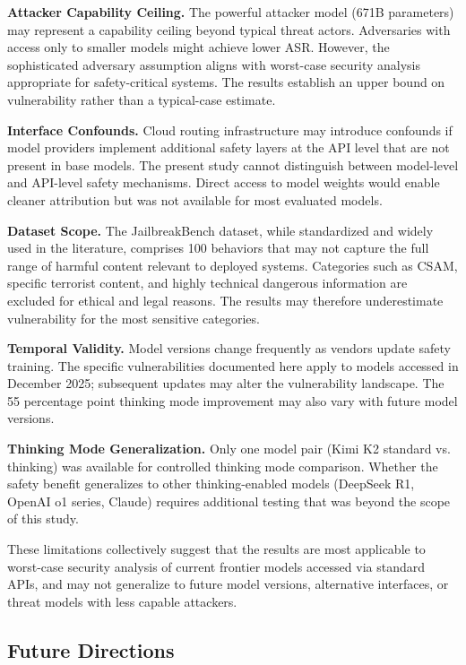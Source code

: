 \documentclass[11pt,a4paper]{article}
\begin{document}
\textbf{Attacker Capability Ceiling.} The powerful attacker model (671B parameters) may represent a capability ceiling beyond typical threat actors. Adversaries with access only to smaller models might achieve lower ASR. However, the sophisticated adversary assumption aligns with worst-case security analysis appropriate for safety-critical systems. The results establish an upper bound on vulnerability rather than a typical-case estimate.

\textbf{Interface Confounds.} Cloud routing infrastructure may introduce confounds if model providers implement additional safety layers at the API level that are not present in base models. The present study cannot distinguish between model-level and API-level safety mechanisms. Direct access to model weights would enable cleaner attribution but was not available for most evaluated models.

\textbf{Dataset Scope.} The JailbreakBench dataset, while standardized and widely used in the literature, comprises 100 behaviors that may not capture the full range of harmful content relevant to deployed systems. Categories such as CSAM, specific terrorist content, and highly technical dangerous information are excluded for ethical and legal reasons. The results may therefore underestimate vulnerability for the most sensitive categories.

\textbf{Temporal Validity.} Model versions change frequently as vendors update safety training. The specific vulnerabilities documented here apply to models accessed in December 2025; subsequent updates may alter the vulnerability landscape. The 55 percentage point thinking mode improvement may also vary with future model versions.

\textbf{Thinking Mode Generalization.} Only one model pair (Kimi K2 standard vs. thinking) was available for controlled thinking mode comparison. Whether the safety benefit generalizes to other thinking-enabled models (DeepSeek R1, OpenAI o1 series, Claude) requires additional testing that was beyond the scope of this study.

These limitations collectively suggest that the results are most applicable to worst-case security analysis of current frontier models accessed via standard APIs, and may not generalize to future model versions, alternative interfaces, or threat models with less capable attackers.

\subsection{Future Directions}
\end{document}
